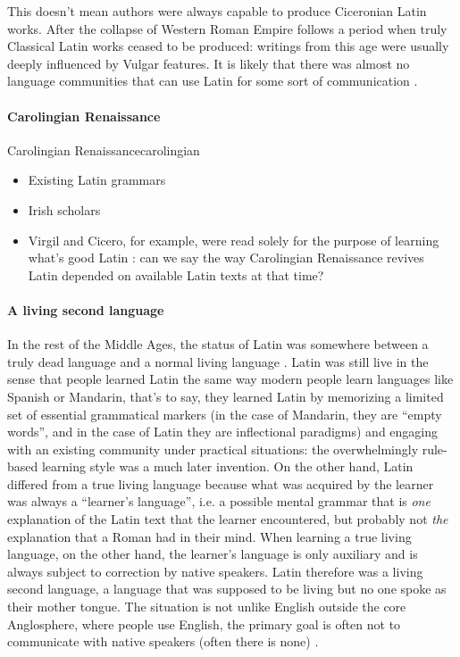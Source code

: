\documentclass[a4paper, oneside, 12pt]{report}
\newcommand*{\citepage}[1]{p.~{#1}}
\newcommand*{\citepages}[1]{pp.~{#1}}
\begin{document}
This doesn't mean authors were always capable to produce Ciceronian Latin works.
After the collapse of Western Roman Empire follows
a period when truly Classical Latin works ceased to be produced:
writings from this age were usually deeply influenced by Vulgar features.
It is likely that there was almost no language communities
that can use Latin for some sort of communication 
\citep[\citepage{160}]{leonhardt2013latin}.

\paragraph*{Carolingian Renaissance}

\begin{todobox}{Carolingian Renaissance}{carolingian}
    \begin{itemize}
        \item Existing Latin grammars 
        \item Irish scholars
        \item Virgil and Cicero, for example, were read solely for the purpose of learning what's good Latin
        \citep[\citepage{170}]{leonhardt2013latin}:
        can we say the way Carolingian Renaissance revives Latin
        depended on available Latin texts at that time?
    \end{itemize}
\end{todobox}

\paragraph*{A living second language}
In the rest of the Middle Ages,
the status of Latin was somewhere between a truly dead language and a normal living language
\citep[\citepage{145-150}]{leonhardt2013latin}.
Latin was still live in the sense that
people learned Latin the same way modern people learn languages like Spanish or Mandarin,
that's to say, they learned Latin by memorizing a limited set of essential grammatical markers
(in the case of Mandarin, they are ``empty words'',
and in the case of Latin they are inflectional paradigms)
and engaging with an existing community under practical situations:
the overwhelmingly rule-based learning style was a much later invention.
On the other hand, Latin differed from a true living language
because what was acquired by the learner was always a ``learner's language'',
i.e. a possible mental grammar that is \emph{one} explanation 
of the Latin text that the learner encountered,
but probably not \emph{the} explanation that a Roman had in their mind.
When learning a true living language, on the other hand,
the learner's language is only auxiliary and is always subject to correction by native speakers.
Latin therefore was a living second language,
a language that was supposed to be living but no one spoke as their mother tongue.
The situation is not unlike English outside the core Anglosphere,
where people use English, the primary goal is often not to communicate with native speakers 
(often there is none)
\citep[\citepages{150-154}]{leonhardt2013latin}.
\end{document}
